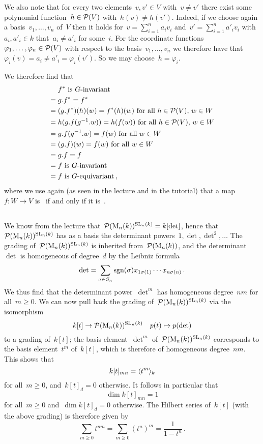 We also note that for every two elements~$v, v' \in V$ with~$v \neq v'$ there exist some polynomial function~$h \in \mathcal{P}(V)$ with~$h(v) \neq h(v')$.
Indeed, if we choose again a basis~$v_1, \dotsc, v_n$ of~$V$ then it holds for~$v = \sum_{i=1}^n a_i v_i$ and~$v' = \sum_{i=1}^n a'_i v_i$ with~$a_i, a'_i \in k$ that~$a_i \neq a'_i$ for some~$i$.
For the coordinate functions~$\varphi_1, \dotsc, \varphi_n \in \mathcal{P}(V)$ with respect to the basis~$v_1, \dotsc, v_n$ we therefore have that~$\varphi_i(v) = a_i \neq a'_i = \varphi_i(v')$.
So we may choose~$h = \varphi_i$.

We therefore find that
\begin{align*}
   {}&  \text{$f^*$ is~\dash{$G$}{invariant}} \\
  ={}&  g.f^* = f^* \\
  ={}&  \text{$(g.f^*)(h)(w) = f^*(h)(w)$ for all~$h \in \Pol(V)$,~$w \in W$} \\
  ={}&  \text{$h(g.f(g^{-1}.w)) = h(f(w))$ for all~$h \in \Pol(V)$,~$w \in W$}  \\
  ={}&  \text{$g.f(g^{-1}.w) = f(w)$ for all~$w \in W$} \\
  ={}&  \text{$(g.f)(w) = f(w)$ for all~$w \in W$}  \\
  ={}&  g.f = f \\
  ={}&  \text{$f$ is~\dash{$G$}{invariant}} \\
  ={}&  \text{$f$ is~\dash{$G$}{equivariant}} \,,
\end{align*}
where we use again (as seen in the lecture and in the tutorial) that a map~$f \colon W \to V$ is~ if and only if it is~.





\subsection{}

We know from the lecture that~$\mathcal{P}(\operatorname{M}_{n}(k))^{\operatorname{SL}_n(k)} = k[\det]$, hence that~$\mathcal{P}(\operatorname{M}_{n}(k))^{\operatorname{SL}_n(k)}$ has as a basis the determinant powers~$1, \det, \det^2, \dotsc$
The grading of~$\mathcal{P}(\operatorname{M}_{n}(k))^{\operatorname{SL}_n(k)}$ is inherited from~$\mathcal{P}(\operatorname{M}_{n}(k))$, and the determinant~$\det$ is homogeneous of degree~$d$ by the Leibniz formula
\[
    \det
  = \sum_{\sigma \in S_n} \operatorname{sgn}(\sigma) x_{1\sigma(1)} \dotsm x_{n\sigma(n)} \,.
\]
We thus find that the determinant power~$\det^m$ has homogeneous degree~$nm$ for all~$m \geq 0$.
We can now pull back the grading of~$\mathcal{P}(\operatorname{M}_{n}(k))^{\operatorname{SL}_n(k)}$ via the isomorphism
\[
          k[t]
  \to     \mathcal{P}(\operatorname{M}_{n}(k))^{\operatorname{SL}_n(k)}
  \quad   p(t)
  \mapsto p(\det)
\]
to a grading of~$k[t]$;
the basis element~$\det^m$ of~$\mathcal{P}(\operatorname{M}_{n}(k))^{\operatorname{SL}_n(k)}$ corresponds to the basis element~$t^m$ of~$k[t]$, which is therefore of homogeneous degree~$nm$.
This shows that
\[
    k[t]_{mn}
  = \langle t^m \rangle_k
\]
for all~$m \geq 0$, and~$k[t]_d = 0$ otherwise.
It follows in particular that
\[
    \dim k[t]_{mn}
  = 1
\]
for all~$m \geq 0$ and~$\dim k[t]_d = 0$ otherwise.
The Hilbert series of~$k[t]$ (with the above grading) is therefore given by
\[
    \sum_{m \geq 0} t^{nm}
  = \sum_{m \geq 0} (t^n)^m
  = \frac{1}{1-t^n} \,.
\]
